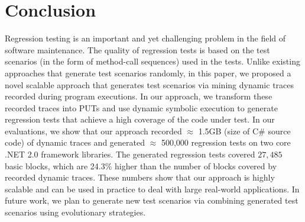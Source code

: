 \section{Conclusion}
\label{sec:concl}

Regression testing is an important and yet challenging problem in the field of software maintenance. The quality of regression tests is based on the test scenarios (in the form of method-call sequences) used in the tests. Unlike existing approaches that generate test scenarios randomly, in this paper, we proposed a novel scalable approach that generates test scenarios via mining dynamic traces recorded during program executions. In our approach, we transform these recorded traces into PUTs and use dynamic symbolic execution to generate regression tests that achieve a high coverage of the code under test. In our evaluations, we show that our approach recorded $\approx$ 1.5GB (size of C\# source code) of dynamic traces and generated $\approx$ 500,000 regression tests on two core .NET 2.0 framework libraries. The generated regression tests covered $27,485$ basic blocks, which are 24.3\% higher than the number of blocks covered by recorded dynamic traces. These numbers show that our approach is highly scalable and can be used in practice to deal with large real-world applications. In future work, we plan to generate new test scenarios via combining generated test scenarios using evolutionary strategies.